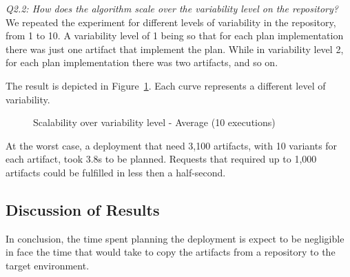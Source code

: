 \emph{Q2.2:  How does the algorithm scale over the variability level on the repository?}
We repeated the experiment for different levels of variability in the repository, from 1 to 10. A variability level of 1 being so that for each plan implementation there was just one artifact that implement the plan. While in variability level 2, for each plan implementation there was two artifacts, and so on.

The result is depicted in Figure~\ref{graph_scalability}. Each curve represents a different level of variability.

\begin{figure}[!htb]
  \centering
  \caption{Scalability over variability level - Average (10 executions)}
\label{graph_scalability}
\end{figure}

At the worst case, a deployment that need 3,100 artifacts, with 10 variants for each artifact, took 3.8s to be planned. Requests that required up to 1,000 artifacts could be fulfilled in less then a half-second.

\subsection{Discussion of Results}

In conclusion, the time spent planning the deployment is expect to be negligible in face the time that would take to copy the artifacts from a repository to the target environment.
